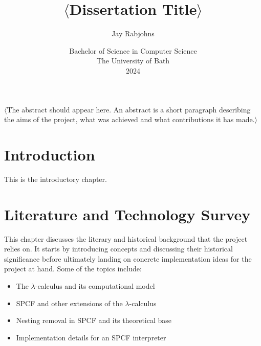 \documentclass[12pt,a4paper]{report}
\title{\bf $\langle$Dissertation Title$\rangle$}
\author{Jay Rabjohns}
\date{Bachelor of Science in Computer Science\\ 
      The University of Bath\\
      2024}
\theoremstyle{definition}
\theoremstyle{remark}
\begin{document}
\hypersetup{pageanchor=false}

\lstset{language=Haskell,breaklines,breakatwhitespace,basicstyle=\small}

\setcounter{page}{0}

\maketitle
\newpage

\newpage

\hypersetup{pageanchor=true}
\abstract
$\langle$The abstract should appear here. An abstract is a short paragraph describing the aims of the project, what was achieved and what contributions it has made.$\rangle$
\newpage

\tableofcontents
\newpage




\newpage
\setcounter{page}{1}
\chapter{Introduction}
This is the introductory chapter.

\chapter{Literature and Technology Survey}
This chapter discusses the literary and historical background that the project relies on. It starts by introducing concepts and discussing their historical significance before ultimately landing on concrete implementation ideas for the project at hand. Some of the topics include:
\begin{itemize}
    \item The $\lambda$-calculus and its computational model
    \item SPCF and other extensions of the $\lambda$-calculus
    \item Nesting removal in SPCF and its theoretical base
    \item Implementation details for an SPCF interpreter
\end{itemize}
\end{document}
